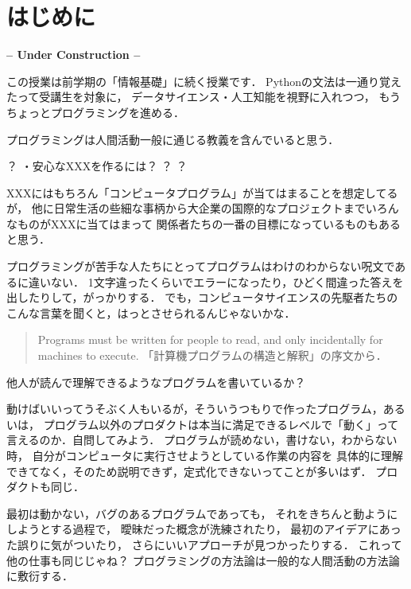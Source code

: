 \section*{はじめに}

{\center\large\bf -- Under Construction --\\}

この授業は前学期の「情報基礎」に続く授業です．
Pythonの文法は一通り覚えたって受講生を対象に，
データサイエンス・人工知能を視野に入れつつ，
もうちょっとプログラミングを進める．

プログラミングは人間活動一般に通じる教義を含んでいると思う．

\begin{itemize}
？
・安心なXXXを作るには？
？
？
\end{itemize}
%
XXXにはもちろん「コンピュータプログラム」が当てはまることを想定してるが，
他に日常生活の些細な事柄から大企業の国際的なプロジェクトまでいろんなものがXXXに当てはまって
関係者たちの一番の目標になっているものもあると思う．

プログラミングが苦手な人たちにとってプログラムはわけのわからない呪文であるに違いない．
1文字違ったくらいでエラーになったり，ひどく間違った答えを出したりして，がっかりする．
でも，コンピュータサイエンスの先駆者たちのこんな言葉を聞くと，はっとさせられるんじゃないかな．

\begin{quote}
Programs must be written for people to read,
and only incidentally for machines to execute.
「計算機プログラムの構造と解釈」の序文から．
\end{quote}

他人が読んで理解できるようなプログラムを書いているか？

動けばいいってうそぶく人もいるが，そういうつもりで作ったプログラム，あるいは，
プログラム以外のプロダクトは本当に満足できるレベルで「動く」って言えるのか．自問してみよう．
プログラムが読めない，書けない，わからない時，
自分がコンピュータに実行させようとしている作業の内容を
具体的に理解できてなく，そのため説明できず，定式化できないってことが多いはず．
プロダクトも同じ．

最初は動かない，バグのあるプログラムであっても，
それをきちんと動ようにしようとする過程で，
曖昧だった概念が洗練されたり，
最初のアイデアにあった誤りに気がついたり，
さらにいいアプローチが見つかったりする．
これって他の仕事も同じじゃね？
プログラミングの方法論は一般的な人間活動の方法論に敷衍する．%

